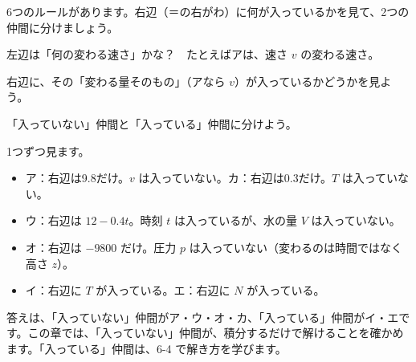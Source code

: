 \begin{yattemiyou}
6つのルールがあります。右辺（＝の右がわ）に何が入っているかを見て、2つの仲間に分けましょう。
\begin{bkcenter}
\end{bkcenter}
\begin{enumerate}[label={\bkcircled[bkGreen]{\arabic*}}, leftmargin=2.4\zw, itemsep=1pt, topsep=3pt]
\item 左辺は「何の変わる速さ」かな？　たとえばアは、速さ $v$ の変わる速さ。
\item 右辺に、その「変わる量そのもの」（アなら $v$）が入っているかどうかを見よう。
\item 「入っていない」仲間と「入っている」仲間に分けよう。
\end{enumerate}
\end{yattemiyou}

\noindent 1つずつ見ます。
\begin{itemize}[leftmargin=1.6\zw, itemsep=1pt, topsep=2pt, label={\color{\bkTT}●}]
\item ア：右辺は9.8だけ。$v$ は入っていない。\quad カ：右辺は0.3だけ。$T$ は入っていない。
\item ウ：右辺は $12-0.4t$。時刻 $t$ は入っているが、水の量 $V$ は入っていない。
\item オ：右辺は $-9800$ だけ。圧力 $p$ は入っていない（変わるのは時間ではなく高さ $z$）。
\item イ：右辺に $T$ が入っている。\quad エ：右辺に $N$ が入っている。
\end{itemize}
答えは、「入っていない」仲間がア・ウ・オ・カ、「入っている」仲間がイ・エです。この章では、「入っていない」仲間が、積分するだけで解けることを確かめます。「入っている」仲間は、6-4 で解き方を学びます。

\begin{omoidasou}
\end{omoidasou}

